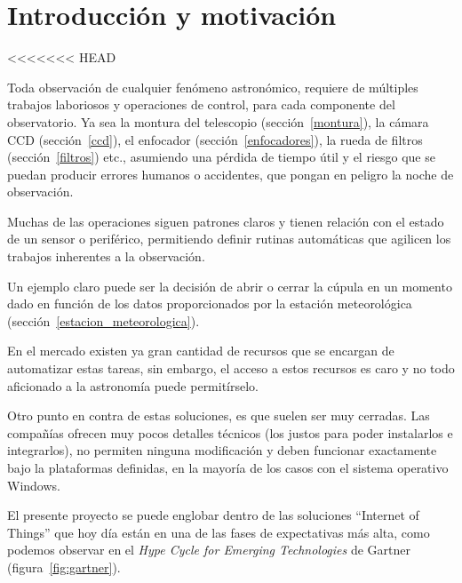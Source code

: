 \chapter{Introducción y motivación}

<<<<<<< HEAD

Toda observación de cualquier fenómeno astronómico, requiere de múltiples trabajos laboriosos y operaciones de control, para cada componente del observatorio. Ya sea la montura del telescopio (sección~\ref{montura}), la cámara CCD (sección~\ref{ccd}), el enfocador (sección~\ref{enfocadores}), la rueda de filtros (sección~\ref{filtros}) etc., asumiendo una pérdida de tiempo útil y el riesgo que se puedan producir errores humanos o accidentes, que pongan en peligro la noche de observación.


Muchas de las operaciones siguen patrones claros y tienen relación con el estado de un sensor o periférico, permitiendo definir rutinas automáticas que agilicen los trabajos inherentes a la observación. 

Un ejemplo claro puede ser la decisión de abrir o cerrar la cúpula en un momento dado en función de los datos proporcionados por la estación meteorológica (sección~\ref{estacion_meteorologica}).


En el mercado existen ya gran cantidad de recursos que se encargan de automatizar estas tareas, sin embargo, el acceso a estos recursos es caro y no todo aficionado a la astronomía puede permitírselo.  

Otro punto en contra de estas soluciones, es que suelen ser muy cerradas. Las compañías ofrecen muy pocos detalles técnicos (los justos para poder instalarlos e integrarlos), no permiten ninguna modificación y deben funcionar exactamente bajo la plataformas definidas, en la mayoría de los casos con el sistema operativo Windows. 

El presente proyecto se puede englobar dentro de las soluciones ``Internet of Things'' que hoy día están en una de las fases de expectativas más alta, como podemos observar en el \textit{Hype Cycle for Emerging Technologies} de Gartner \cite{hypeGartner} (figura~\ref{fig:gartner}).


